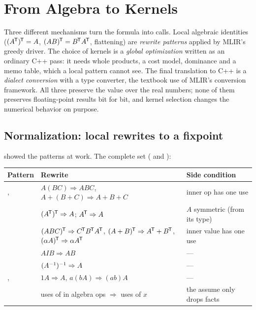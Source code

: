 \chapter{From Algebra to Kernels}
\label{ch:kernels}

\begin{answer}
Three different mechanisms turn the formula into calls. Local algebraic
identities (\((A^{\mkern-1.5mu\mathsf{T}})^{\mkern-1.5mu\mathsf{T}} = A\), \((AB)^{\mkern-1.5mu\mathsf{T}} = B^{\mkern-1.5mu\mathsf{T}} A^{\mkern-1.5mu\mathsf{T}}\), flattening) are
\emph{rewrite patterns} applied by MLIR's greedy driver. The choice of
kernels is a \emph{global optimization} written as an ordinary C++ pass: it
needs whole products, a cost model, dominance and a memo table, which a
local pattern cannot see. The final translation to C++ is a \emph{dialect
conversion} with a type converter, the textbook use of MLIR's conversion
framework. All three preserve the value over the real numbers; none of them
preserves floating-point results bit for bit, and kernel selection changes
the numerical behavior on purpose.
\end{answer}

\section{Normalization: local rewrites to a fixpoint}
\label{sec:kernels-normal}

 showed the patterns at work. The complete set
( and
):

\begin{center}\small
\begin{tabularx}{\linewidth}{@{}P{3.4cm}P{4.6cm}L@{}}
\toprule
\textbf{Pattern} & \textbf{Rewrite} & \textbf{Side condition} \\
\midrule
{},  & \(A(BC) \Rightarrow ABC\), \(A + (B + C) \Rightarrow A + B + C\) & inner op has one use \\
 & \((A^{\mkern-1.5mu\mathsf{T}})^{\mkern-1.5mu\mathsf{T}} \Rightarrow A\); \(A^{\mkern-1.5mu\mathsf{T}} \Rightarrow A\) & \(A\) symmetric (from its type) \\
 & \((ABC)^{\mkern-1.5mu\mathsf{T}} \Rightarrow C^{\mkern-1.5mu\mathsf{T}} B^{\mkern-1.5mu\mathsf{T}} A^{\mkern-1.5mu\mathsf{T}}\), \((A+B)^{\mkern-1.5mu\mathsf{T}} \Rightarrow A^{\mkern-1.5mu\mathsf{T}} + B^{\mkern-1.5mu\mathsf{T}}\), \((\alpha A)^{\mkern-1.5mu\mathsf{T}} \Rightarrow \alpha A^{\mkern-1.5mu\mathsf{T}}\) & inner value has one use \\
 & \(A I B \Rightarrow AB\) & --- \\
 & \((A^{-1})^{-1} \Rightarrow A\) & --- \\
,  & \(1A \Rightarrow A\), \(a(bA) \Rightarrow (ab)A\) & --- \\
 & uses of  in algebra ops \(\Rightarrow\) uses of \(x\) & the assume only drops facts \\
\bottomrule
\end{tabularx}
\end{center}

